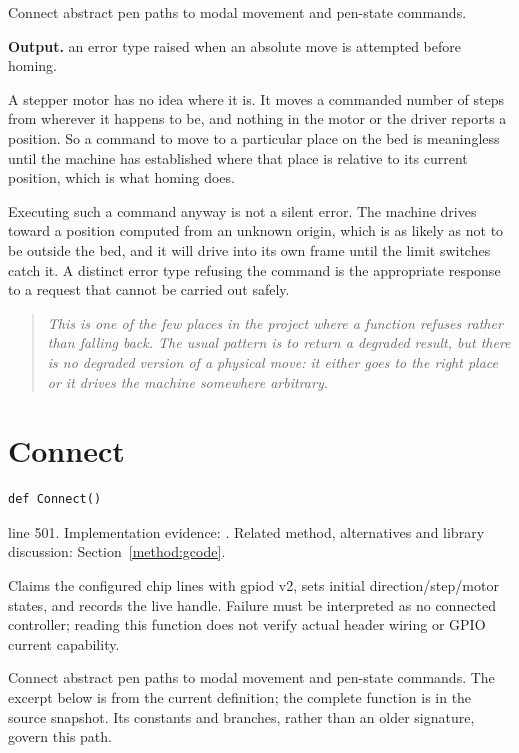 Connect abstract pen paths to modal movement and pen-state commands.




\noindent\textbf{Output.} an error type raised when an absolute move is attempted before homing.


A stepper motor has no idea where it is. It moves a commanded number of steps from wherever it happens to be, and nothing in the motor or the driver reports a position. So a command to move to a particular place on the bed is meaningless until the machine has established where that place is relative to its current position, which is what homing does.

Executing such a command anyway is not a silent error. The machine drives toward a position computed from an unknown origin, which is as likely as not to be outside the bed, and it will drive into its own frame until the limit switches catch it. A distinct error type refusing the command is the appropriate response to a request that cannot be carried out safely.


\begin{quote}\small\itshape This is one of the few places in the project where a function refuses rather than falling back. The usual pattern is to return a degraded result, but there is no degraded version of a physical move: it either goes to the right place or it drives the machine somewhere arbitrary.\end{quote}


\section{Connect}\label{fn:reproduce:Connect}
\begin{lstlisting}[style=sig]
def Connect()
\end{lstlisting}
 line 501. Implementation evidence: \cite{code2026}. Related method, alternatives and library discussion: Section~\ref{method:gcode}.


Claims the configured chip lines with gpiod v2, sets initial direction/step/motor states, and records the live handle. Failure must be interpreted as no connected controller; reading this function does not verify actual header wiring or GPIO current capability.


Connect abstract pen paths to modal movement and pen-state commands. The excerpt below is from the current definition; the complete function is in the source snapshot. Its constants and branches, rather than an older signature, govern this path.


